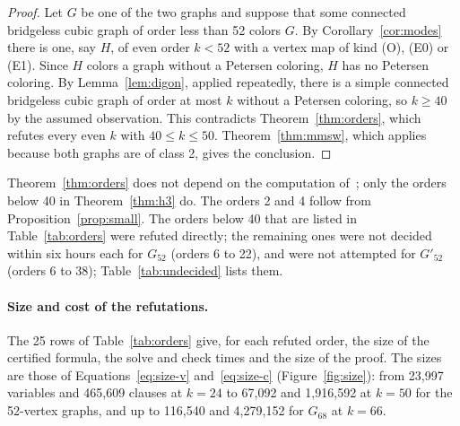 \documentclass[11pt]{article}
\theoremstyle{definition}
\theoremstyle{remark}
\newcommand{\Ga}{G_{52}}
\newcommand{\Gb}{G'_{52}}
\newcommand{\Gsix}{G_{68}}
\begin{document}
\begin{proof}
Let $G$ be one of the two graphs and suppose that some connected bridgeless cubic graph of order
less than 52 colors $G$. By Corollary~\ref{cor:modes} there is one, say $H$, of even order
$k < 52$ with a vertex map of kind (O), (E0) or (E1). Since $H$ colors a graph without a Petersen
coloring, $H$ has no Petersen coloring. By Lemma~\ref{lem:digon}, applied repeatedly, there is a
simple connected bridgeless cubic graph of order at most $k$ without a Petersen coloring, so
$k \ge 40$ by the assumed observation. This contradicts Theorem~\ref{thm:orders}, which refutes every even
$k$ with $40 \le k \le 50$. Theorem~\ref{thm:mmsw}, which applies because both graphs are of class 2, gives the conclusion.
\end{proof}

Theorem~\ref{thm:orders} does not depend on the computation of~\cite{GJMMMU2026}; only the orders
below 40 in Theorem~\ref{thm:h3} do. The orders 2 and 4 follow from Proposition~\ref{prop:small}. The orders below 40 that are listed in
Table~\ref{tab:orders} were refuted directly; the remaining ones were not decided within six
hours each for $\Ga$ (orders 6 to 22), and were not attempted for $\Gb$ (orders 6 to 38); Table~\ref{tab:undecided} lists them.


\paragraph{Size and cost of the refutations.} The 25 rows of Table~\ref{tab:orders} give, for each refuted order, the size of the certified formula, the solve and check times and the size of the proof. The sizes are those of Equations~\eqref{eq:size-v} and~\eqref{eq:size-c} (Figure~\ref{fig:size}): from 23{,}997 variables and 465{,}609
clauses at $k = 24$ to 67{,}092 and 1{,}916{,}592 at $k = 50$ for the 52-vertex graphs, and up to 116{,}540 and 4{,}279{,}152 for $\Gsix$ at $k = 66$.
\end{document}
